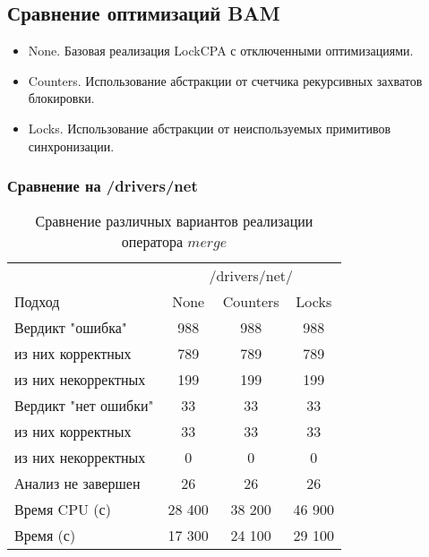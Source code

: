 \subsection{Сравнение оптимизаций BAM}

\begin{itemize}
\item None. Базовая реализация LockCPA с отключенными оптимизациями.
\item Counters. Использование абстракции от счетчика рекурсивных захватов блокировки.
\item Locks. Использование абстракции от неиспользуемых примитивов синхронизации.
\end{itemize}

\subsubsection{Сравнение на /drivers/net}
\begin{center}
  \begin{table}[h]\footnotesize
  	\label{table-drivers-lock-merge}
    \caption{Сравнение различных вариантов реализации оператора $merge$}
    \begin{tabular}{ | l | c | c | c | }
      \hline
      		& 		 \multicolumn{3}{|c|}{/drivers/net/} \\
      Подход         				& None 	& Counters 	& Locks  \\ \hline
      Вердикт "ошибка" 				& 988   & 988       & 988       \\ 
  \hspace{0.5cm} из них корректных 	& 789 	& 789 		& 789     \\ 
  \hspace{0.5cm} из них некорректных & 199 	& 199 		& 199       \\ \hline
      Вердикт "нет ошибки"  		& 33    & 33        & 33      \\ 
  \hspace{0.5cm} из них корректных 	& 33 	& 33    	& 33      \\
  \hspace{0.5cm} из них некорректных & 0 	& 0    		& 0     \\ \hline
      Анализ не завершен       		& 26    & 26        & 26    \\ \hline
      Время CPU (с)   				& 28 400 & 38 200   & 46 900    \\ 
      Время (с)  					& 17 300 & 24 100   & 29 100      \\
      \hline
    \end{tabular}
  \end{table}
\end{center}

